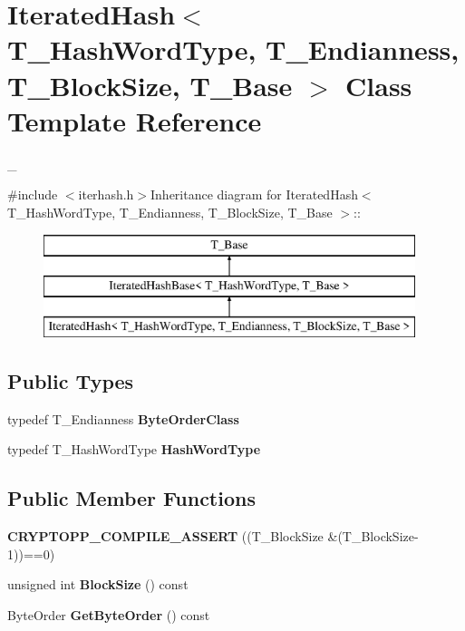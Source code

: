 \hypertarget{class_iterated_hash}{
\section{IteratedHash$<$ T\_\-HashWordType, T\_\-Endianness, T\_\-BlockSize, T\_\-Base $>$ Class Template Reference}
\label{class_iterated_hash}
}


\_\-  


{\ttfamily \#include $<$iterhash.h$>$}Inheritance diagram for IteratedHash$<$ T\_\-HashWordType, T\_\-Endianness, T\_\-BlockSize, T\_\-Base $>$::\begin{figure}[H]
\begin{center}
\leavevmode
\includegraphics[height=3cm]{class_iterated_hash}
\end{center}
\end{figure}
\subsection*{Public Types}
\begin{DoxyCompactItemize}
\item 
\hypertarget{class_iterated_hash_a6ec15728121293aef70ca8b30b2e7e7a}{
typedef T\_\-Endianness {\bfseries ByteOrderClass}}
\label{class_iterated_hash_a6ec15728121293aef70ca8b30b2e7e7a}

\item 
\hypertarget{class_iterated_hash_ace0350088eea8679cbe23668d2498c07}{
typedef T\_\-HashWordType {\bfseries HashWordType}}
\label{class_iterated_hash_ace0350088eea8679cbe23668d2498c07}

\end{DoxyCompactItemize}
\subsection*{Public Member Functions}
\begin{DoxyCompactItemize}
\item 
\hypertarget{class_iterated_hash_a23443812c93867ca52675f6d76bc9def}{
{\bfseries CRYPTOPP\_\-COMPILE\_\-ASSERT} ((T\_\-BlockSize \&(T\_\-BlockSize-\/1))==0)}
\label{class_iterated_hash_a23443812c93867ca52675f6d76bc9def}

\item 
\hypertarget{class_iterated_hash_a272b3589e2f6648da8d4caa8603397dd}{
unsigned int {\bfseries BlockSize} () const }
\label{class_iterated_hash_a272b3589e2f6648da8d4caa8603397dd}

\item 
\hypertarget{class_iterated_hash_ab36955b4beefcf630a120f1b3b261dc7}{
ByteOrder {\bfseries GetByteOrder} () const }
\label{class_iterated_hash_ab36955b4beefcf630a120f1b3b261dc7}

\end{DoxyCompactItemize}
